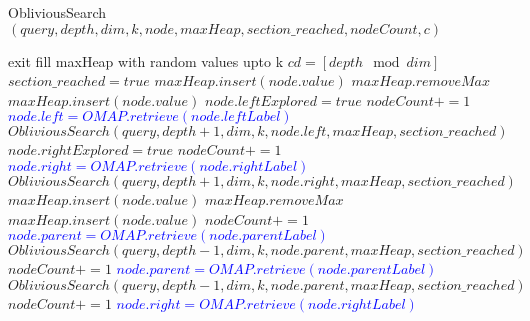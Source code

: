 \documentclass{article}
\begin{document}
\begin{algorithm}
    \caption{ObliviousSearch $(query, depth, dim, k, node, maxHeap, section\_reached, nodeCount, c)$}\label{alg:cap}
    \begin{algorithmic}
    {\ttfamily \footnotesize{
            \State exit
                \State fill maxHeap with random values upto k
            \EndIf
        \EndIf
        \State $cd = [depth \mod dim]$
                \State $section\_reached = true$
            \EndIf
                \State $maxHeap.insert(node.value)$
                \State $maxHeap.removeMax$
                \State $maxHeap.insert(node.value)$
            \EndIf
                \State $node.leftExplored = true$
                \State $nodeCount += 1$
                \textcolor{blue}{\State $node.left = OMAP.retrieve(node.leftLabel)$}
                \State $ObliviousSearch(query, depth+1, dim, k, node.left, maxHeap, section\_reached)$
                \State $node.rightExplored = true$
                \State $nodeCount += 1$
                \textcolor{blue}{\State $node.right = OMAP.retrieve(node.rightLabel)$}
                \State $ObliviousSearch(query, depth+1, dim, k, node.right, maxHeap, section\_reached)$
            \EndIf
        \Else
                \State $maxHeap.insert(node.value)$
                \State $maxHeap.removeMax$
                \State $maxHeap.insert(node.value)$
            \EndIf
                \State $nodeCount += 1$
                \textcolor{blue}{\State $node.parent = OMAP.retrieve(node.parentLabel)$}
                \State $ObliviousSearch(query, depth-1, dim, k, node.parent, maxHeap, section\_reached)$
            \Else
                    \State $nodeCount += 1$
                    \textcolor{blue}{\State $node.parent = OMAP.retrieve(node.parentLabel)$}
                    \State $ObliviousSearch(query, depth-1, dim, k, node.parent, maxHeap, section\_reached)$
                    \State $nodeCount += 1$
                    \textcolor{blue}{\State $node.right = OMAP.retrieve(node.rightLabel)$}
}}
\end{algorithmic}
\end{algorithm}
\end{document}

